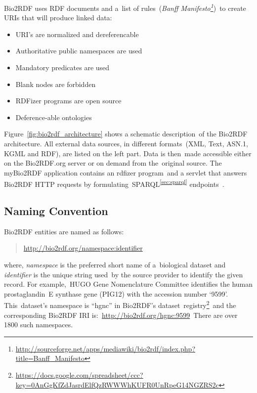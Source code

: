 \documentclass[DIV=calc, paper=a4, fontsize=12pt, onecolumn]{scrartcl}	 %
\begin{document}
  \noindent Bio2RDF uses RDF documents and a\
  list of rules\
  (\emph{Banff Manifesto\footnote{\url{http://sourceforge.net/apps/mediawiki/bio2rdf/index.php?title=Banff_Manifesto}}})\
  to create URIs that will produce linked data:
  \begin{itemize}
    \itemindent3em
    \itemsep0ex
    \item [\textbf{Rule 1:}] URI's are normalized and dereferencable
    \item [\textbf{Rule 2:}] Authoritative public namespaces are used 
    \item [\textbf{Rule 3:}] Mandatory predicates are used
    \item [\textbf{Rule 4:}] Blank nodes are forbidden
    \item [\textbf{Rule 5:}] RDFizer programs are open source
    \item [\textbf{Rule 6:}] Deference-able ontologies
  \end{itemize}
  Figure~\ref{fig:bio2rdf_architecture} shows a schematic description\
  of the Bio2RDF architecture. All external data sources, in different formats\
  (XML, Text, ASN.1, KGML and RDF), are listed on the left part. Data is then\
  made accessible either on the Bio2RDF.org server or on demand from the\
  original source. The myBio2RDF application contains an rdfizer program\
  and a servlet that answers Bio2RDF HTTP requests by formulating\
  SPARQL\textsuperscript{\ref{sec:sparql}} endpoints~\citep{callahan_bio2rdf_2013}.\\
  
  \subsection{Naming Convention}
  Bio2RDF entities are named as follows:
  \begin{quote}
    \url{http://bio2rdf.org/namespace:identifier}
  \end{quote}
  \noindent where, \emph{namespace} is the preferred short name of a\
  biological dataset and \emph{identifier} is the unique string used\
  by the source provider to identify the given record. For example,\
  HUGO Gene Nomenclature Committee identifies the human prostaglandin\
  E synthase gene (PIG12) with the accession number `9599'. This\
  dataset's namespace is ``hgnc'' in Bio2RDF's dataset\
  registry\footnote{\url{https://docs.google.com/spreadsheet/ccc?key=0AnGgKfZdJasrdElfQzRWWWhKUFR0UnRpeG14NGZRS2c}}\
  and the corresponding Bio2RDF IRI is:~\url{http://bio2rdf.org/hgnc:9599}\
  There are over 1800 such namespaces.
  
\end{document}
